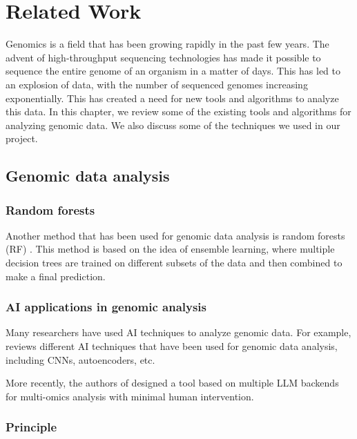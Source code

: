 \chapter{Related Work}
\label{chap:related-work}

Genomics is a field that has been growing rapidly in the past few years. The advent of high-throughput
sequencing technologies has made it possible to sequence the entire genome of an organism in a matter
of days. This has led to an explosion of data, with the number of sequenced genomes increasing exponentially.
This has created a need for new tools and algorithms to analyze this data. In this chapter, we review
some of the existing tools and algorithms for analyzing genomic data. We also discuss some of the techniques
we used in our project.

\section{Genomic data analysis}
\label{sec:genomic-data-analysis}

\subsection*{Random forests}
\label{subsec:random-forests}

Another method that has been used for genomic data analysis is random forests (RF) \cite{Chen-Ishwaran-2012}.
This method is based on the idea of ensemble learning, where multiple decision trees are trained on different
subsets of the data and then combined to make a final prediction.

\subsection*{AI applications in genomic analysis}
\label{sec:ai-applications-in-genomic-analysis}

Many researchers have used AI techniques to analyze genomic data. For example, \cite{Caudai-et-al-2021} reviews
different AI techniques that have been used for genomic data analysis, including CNNs, autoencoders, etc.

More recently, the authors of \cite{Zhou-et-al-2024} designed a tool based on multiple LLM backends for multi-omics
analysis with minimal human intervention.

\subsection{Principle}
\label{subsec:principle_dbscan_hdbscan}

